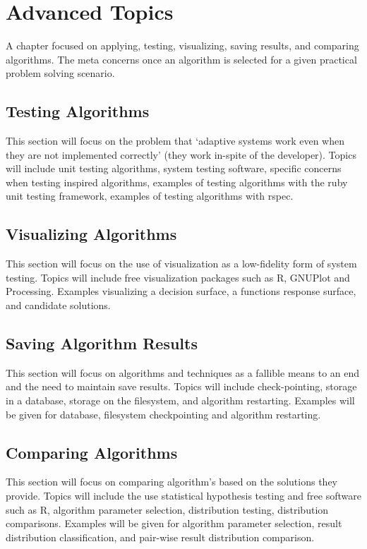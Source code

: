 


\chapter{Advanced Topics}
\label{ch:advanced}
A chapter focused on applying, testing, visualizing, saving results, and comparing algorithms. The meta concerns once an algorithm is selected for a given practical problem solving scenario.

\section{Testing Algorithms}
This section will focus on the problem that `adaptive systems work even when they are not implemented correctly' (they work in-spite of the developer). Topics will include unit testing algorithms, system testing software, specific concerns when testing inspired algorithms, examples of testing algorithms with the ruby unit testing framework, examples of testing algorithms with rspec.

\section{Visualizing Algorithms}
This section will focus on the use of visualization as a low-fidelity form of system testing. Topics will include free visualization packages such as R, GNUPlot and Processing. Examples visualizing a decision surface, a functions response surface, and candidate solutions.

\section{Saving Algorithm Results}
This section will focus on algorithms and techniques as a fallible means to an end and the need to maintain save results. Topics will include check-pointing, storage in a database, storage on the filesystem, and algorithm restarting. Examples will be given for database, filesystem checkpointing and algorithm restarting.

\section{Comparing Algorithms}
This section will focus on comparing algorithm's based on the solutions they provide. Topics will include the use statistical hypothesis testing and free software such as R, algorithm parameter selection, distribution testing, distribution comparisons. Examples will be given for algorithm parameter selection, result distribution classification, and pair-wise result distribution comparison.